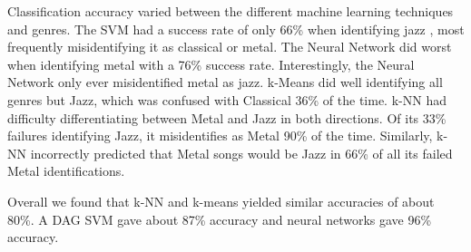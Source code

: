 Classification accuracy varied between the different machine learning techniques and genres. The SVM had a success rate of only 66\% when identifying jazz , most frequently misidentifying it as classical or metal. The Neural Network did worst when identifying metal with a 76\% success rate. Interestingly, the Neural Network only ever misidentified metal as jazz. k-Means did well identifying all genres but Jazz, which was confused with Classical 36\% of the time. k-NN had difficulty differentiating between Metal and Jazz in both directions. Of its 33\% failures identifying Jazz, it misidentifies as Metal 90\% of the time. Similarly, k-NN incorrectly predicted that Metal songs would be Jazz in 66\% of all its failed Metal identifications.

Overall we found that k-NN and k-means yielded similar accuracies of about 80\%. A DAG SVM gave about 87\% accuracy and neural networks gave 96\% accuracy.
